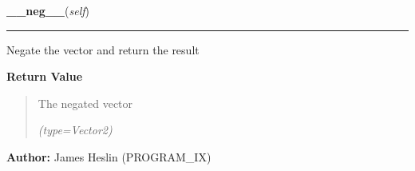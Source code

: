 \hspace{.8\funcindent}\begin{boxedminipage}{\funcwidth}

    \raggedright \textbf{\_\_neg\_\_}(\textit{self})

    \vspace{-1.5ex}

    \rule{\textwidth}{0.5\fboxrule}
\setlength{\parskip}{2ex}
    Negate the vector and return the result

\setlength{\parskip}{1ex}
      \textbf{Return Value}
    \vspace{-1ex}

      \begin{quote}
      The negated vector

      {\it (type=Vector2)}

      \end{quote}

\textbf{Author:} James Heslin (PROGRAM\_IX)



    \end{boxedminipage}

    \label{pystroke:vector2:Vector2:__mul__}

    \vspace{0.5ex}


